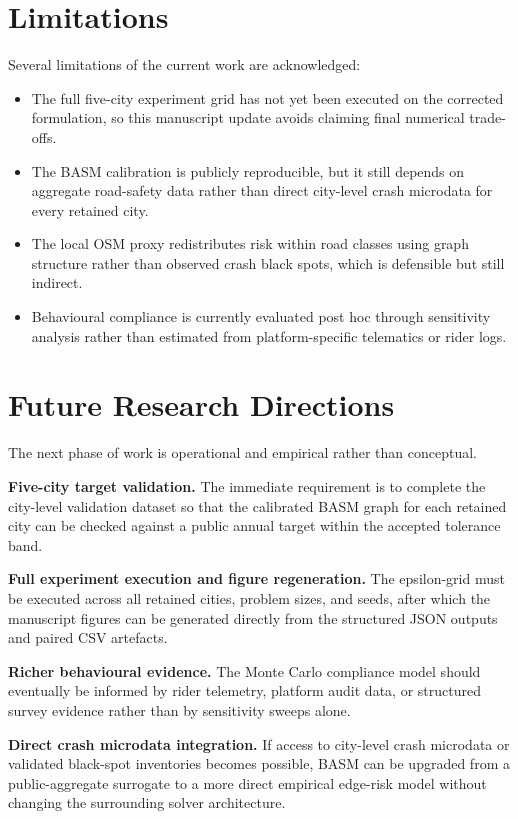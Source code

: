 \section{Limitations}

Several limitations of the current work are acknowledged:

\begin{itemize}
    \item The full five-city experiment grid has not yet been executed on the corrected formulation, so this manuscript update avoids claiming final numerical trade-offs.
    \item The BASM calibration is publicly reproducible, but it still depends on aggregate road-safety data rather than direct city-level crash microdata for every retained city.
    \item The local OSM proxy redistributes risk within road classes using graph structure rather than observed crash black spots, which is defensible but still indirect.
    \item Behavioural compliance is currently evaluated post hoc through sensitivity analysis rather than estimated from platform-specific telematics or rider logs.
\end{itemize}

\section{Future Research Directions}

The next phase of work is operational and empirical rather than conceptual.

\vspace{0.5em}
\noindent\textbf{Five-city target validation.}
The immediate requirement is to complete the city-level validation dataset so that the calibrated BASM graph for each retained city can be checked against a public annual target within the accepted tolerance band.

\vspace{0.5em}
\noindent\textbf{Full experiment execution and figure regeneration.}
The epsilon-grid must be executed across all retained cities, problem sizes, and seeds, after which the manuscript figures can be generated directly from the structured JSON outputs and paired CSV artefacts.

\vspace{0.5em}
\noindent\textbf{Richer behavioural evidence.}
The Monte Carlo compliance model should eventually be informed by rider telemetry, platform audit data, or structured survey evidence rather than by sensitivity sweeps alone.

\vspace{0.5em}
\noindent\textbf{Direct crash microdata integration.}
If access to city-level crash microdata or validated black-spot inventories becomes possible, BASM can be upgraded from a public-aggregate surrogate to a more direct empirical edge-risk model without changing the surrounding solver architecture.
